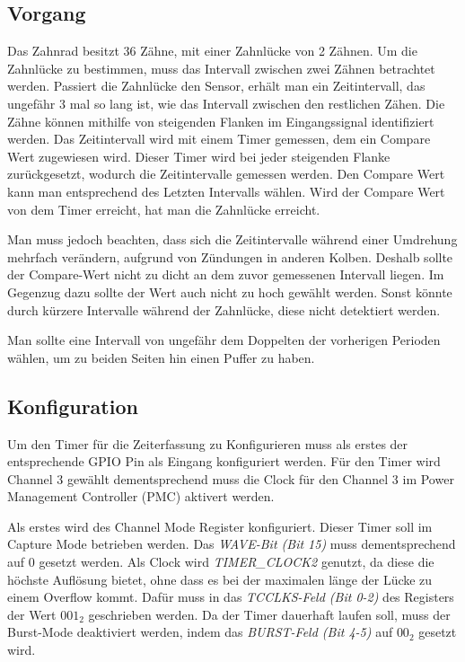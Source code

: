\documentclass[12pt]{article}
\begin{document}
\subsection{Vorgang}
Das Zahnrad besitzt 36 Zähne, mit einer Zahnlücke von 2 Zähnen.
Um die Zahnlücke zu bestimmen, muss das Intervall zwischen zwei Zähnen betrachtet werden.
Passiert die Zahnlücke den Sensor, erhält man ein Zeitintervall, das ungefähr 3 mal so lang ist, wie das
Intervall zwischen den restlichen Zähen.
Die Zähne können mithilfe von steigenden Flanken im Eingangssignal identifiziert werden.
Das Zeitintervall wird mit einem Timer gemessen, dem ein Compare Wert zugewiesen wird.
Dieser Timer wird bei jeder steigenden Flanke zurückgesetzt, wodurch die Zeitintervalle gemessen werden.
Den Compare Wert kann man entsprechend des Letzten Intervalls wählen. Wird der Compare Wert von dem Timer erreicht,
hat man die Zahnlücke erreicht.

Man muss jedoch beachten, dass sich die Zeitintervalle während einer Umdrehung mehrfach verändern,
aufgrund von Zündungen in anderen Kolben.
Deshalb sollte der Compare-Wert nicht zu dicht an dem zuvor gemessenen Intervall liegen. 
Im Gegenzug dazu sollte der Wert auch nicht zu hoch gewählt werden. Sonst könnte durch kürzere Intervalle während der
Zahnlücke, diese nicht detektiert werden.

Man sollte eine Intervall von ungefähr dem Doppelten der vorherigen Perioden wählen, um zu beiden Seiten hin einen
Puffer zu haben.

\subsection{Konfiguration}
Um den Timer für die Zeiterfassung zu Konfigurieren muss als erstes der entsprechende GPIO Pin als Eingang konfiguriert werden.
Für den Timer wird Channel 3 gewählt dementsprechend muss die Clock für den Channel 3 im Power Management Controller (PMC) aktivert werden.

Als erstes wird des Channel Mode Register konfiguriert.
Dieser Timer soll im Capture Mode betrieben werden. Das \textit{WAVE-Bit (Bit 15)} muss dementsprechend auf 0 gesetzt werden.
Als Clock wird \textit{TIMER\_CLOCK2} genutzt, da diese die höchste Auflösung bietet, ohne dass es bei der
maximalen länge der Lücke zu einem Overflow kommt. Dafür muss in das \textit{TCCLKS-Feld (Bit 0-2)} des Registers der Wert $001_{2}$ geschrieben werden.
Da der Timer dauerhaft laufen soll, muss der Burst-Mode deaktiviert werden, indem das \textit{BURST-Feld (Bit 4-5)} auf $00_{2}$ gesetzt wird.
\end{document}
